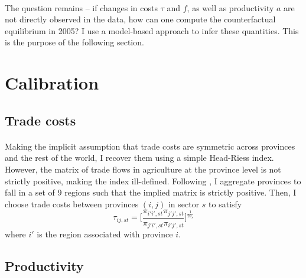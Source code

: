 \documentclass[]{article}
\theoremstyle{plain}
\begin{document}
\paragraph*{}
 The question remains -- if changes in costs $\tau$ and $f$, as well as productivity $a$ are not directly observed in the data, how can one compute the counterfactual equilibrium in 2005? I use a model-based approach to infer these quantities. This is the purpose of the following section.
 
\section{Calibration}\label{sect:calibration}
\subsection*{Trade costs}
\paragraph*{}
Making the implicit assumption that trade costs are symmetric across provinces and the rest of the world, I recover them using a simple Head-Riess index. However, the matrix of trade flows in agriculture at the province level is not strictly positive, making the index ill-defined. Following \cite{tombezhu}, I aggregate provinces to fall in a set of 9 regions such that the implied matrix is strictly positive. Then, I choose trade costs between provinces $(i, j)$ in sector $s$ to satisfy
\begin{equation}
	\tau_{ij, st} = \bigg[\frac{\pi_{i'i', st}\pi_{j'j', st}}{\pi_{j'i', st}\pi_{i'j', st}}\bigg]^{\frac{1}{2\theta_{s}}}
\end{equation}
where $i'$ is the region associated with province $i$. 
\subsection*{Productivity}
\end{document}
